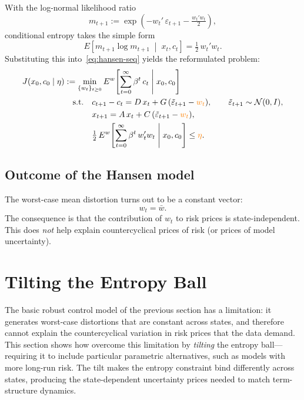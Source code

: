 \documentclass[12pt]{article}
\theoremstyle{definition}
\begin{document}
With the log-normal likelihood ratio
\[
   m_{t+1} := \exp\!\left(- w_t'\, \varepsilon_{t+1}
       - \tfrac{w_t' w_t}{2}\right),
\]
conditional entropy takes the simple form
\[
   E\!\left[m_{t+1}\log m_{t+1} \;\middle|\; x_t, c_t\right]
       = \tfrac{1}{2}\, w_t' w_t.
\]
Substituting this into~\eqref{eq:hansen-seq} yields the reformulated
problem:
\begin{align}
J(x_0, c_0 \mid \eta) &:= \min_{\{w_t\}_{t\geq 0}}
    E^w\!\left[\sum_{t=0}^{\infty} \beta^t\, c_t
    \;\middle|\; x_0, c_0\right] \label{eq:hansen-seq2}\\
&\quad \text{s.t.}\quad
    c_{t+1} - c_t = D\, x_t + G\,(\tilde\varepsilon_{t+1}
    - {\color{orange} w_t}), \qquad
    \tilde\varepsilon_{t+1} \sim {\mathcal N}(0,I), \notag\\
&\quad\hphantom{\text{s.t.}}\quad
    x_{t+1} = A\, x_t + C\,(\tilde\varepsilon_{t+1}
    - {\color{orange} w_t}), \notag\\
&\quad\hphantom{\text{s.t.}}\quad
    \tfrac{1}{2}\, E^w\!\left[\sum_{t=0}^{\infty} \beta^t\,
    w_t' w_t \;\middle|\; x_0, c_0\right] \leq
    {\color{orange} \eta}. \notag
\end{align}

\subsection{Outcome of the Hansen model}

The worst-case mean distortion turns out to be a constant vector:
\[
   w_t = \bar w.
\]
The consequence is that the contribution of $w_t$ to risk prices is
state-independent.  This does \emph{not} help explain countercyclical
prices of risk (or prices of model uncertainty).


\section{Tilting the Entropy Ball}
\label{sec:tilted}

The basic robust control model of the previous section has a limitation:
it generates worst-case distortions that are constant across states, and
therefore cannot explain the countercyclical variation in risk prices
that the data demand.  This section shows how \citet{HSHS2020}
overcome this limitation by \emph{tilting} the entropy ball---requiring
it to include particular parametric alternatives, such as models with
more long-run risk.  The tilt makes the entropy constraint bind
differently across states, producing the state-dependent uncertainty
prices needed to match term-structure dynamics.
\end{document}
